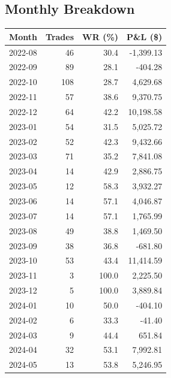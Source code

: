\documentclass[11pt,a4paper]{article}
\begin{document}
\subsection*{Monthly Breakdown}
\noindent\begin{center}
\begin{tabular}{>{\color{txtmain}}l rrr}
\toprule
\rowcolor{cardbg}
\textbf{Month} & \textbf{Trades} & \textbf{WR (\%)} & \textbf{P\&L (\$)} \\
\midrule
2022-08 & 46 & 30.4 & \textcolor{lossred}{-1,399.13} \\
2022-09 & 89 & 28.1 & \textcolor{lossred}{-404.28} \\
2022-10 & 108 & 28.7 & \textcolor{wingreen}{4,629.68} \\
2022-11 & 57 & 38.6 & \textcolor{wingreen}{9,370.75} \\
2022-12 & 64 & 42.2 & \textcolor{wingreen}{10,198.58} \\
2023-01 & 54 & 31.5 & \textcolor{wingreen}{5,025.72} \\
2023-02 & 52 & 42.3 & \textcolor{wingreen}{9,432.66} \\
2023-03 & 71 & 35.2 & \textcolor{wingreen}{7,841.08} \\
2023-04 & 14 & 42.9 & \textcolor{wingreen}{2,886.75} \\
2023-05 & 12 & 58.3 & \textcolor{wingreen}{3,932.27} \\
2023-06 & 14 & 57.1 & \textcolor{wingreen}{4,046.87} \\
2023-07 & 14 & 57.1 & \textcolor{wingreen}{1,765.99} \\
2023-08 & 49 & 38.8 & \textcolor{wingreen}{1,469.50} \\
2023-09 & 38 & 36.8 & \textcolor{lossred}{-681.80} \\
2023-10 & 53 & 43.4 & \textcolor{wingreen}{11,414.59} \\
2023-11 & 3 & 100.0 & \textcolor{wingreen}{2,225.50} \\
2023-12 & 5 & 100.0 & \textcolor{wingreen}{3,889.84} \\
2024-01 & 10 & 50.0 & \textcolor{lossred}{-404.10} \\
2024-02 & 6 & 33.3 & \textcolor{lossred}{-41.40} \\
2024-03 & 9 & 44.4 & \textcolor{wingreen}{651.84} \\
2024-04 & 32 & 53.1 & \textcolor{wingreen}{7,992.81} \\
2024-05 & 13 & 53.8 & \textcolor{wingreen}{5,246.95} \\

\end{tabular}
\end{center}
\end{document}
